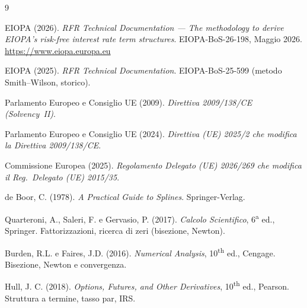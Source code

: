 \documentclass[11pt,a4paper]{article}
\theoremstyle{plain}
\theoremstyle{definition}
\theoremstyle{remark}
\begin{document}
\renewcommand{\refname}{Riferimenti bibliografici}
\begin{thebibliography}{9}

EIOPA (2026).
\textit{RFR Technical Documentation --- The methodology to derive EIOPA's risk-free
interest rate term structures}. EIOPA-BoS-26-198, Maggio 2026.
\url{https://www.eiopa.europa.eu}

EIOPA (2025).
\textit{RFR Technical Documentation}. EIOPA-BoS-25-599 (metodo Smith--Wilson, storico).

Parlamento Europeo e Consiglio UE (2009).
\textit{Direttiva 2009/138/CE (Solvency~II)}.

Parlamento Europeo e Consiglio UE (2024).
\textit{Direttiva (UE) 2025/2 che modifica la Direttiva 2009/138/CE}.

Commissione Europea (2025).
\textit{Regolamento Delegato (UE) 2026/269 che modifica il Reg.\ Delegato (UE) 2015/35}.

de Boor, C. (1978).
\textit{A Practical Guide to Splines}. Springer-Verlag.

Quarteroni, A., Saleri, F. e Gervasio, P. (2017).
\textit{Calcolo Scientifico}, 6\textsuperscript{a} ed., Springer.
Fattorizzazioni, ricerca di zeri (bisezione, Newton).

Burden, R.L. e Faires, J.D. (2016).
\textit{Numerical Analysis}, 10\textsuperscript{th} ed., Cengage.
Bisezione, Newton e convergenza.

Hull, J. C. (2018).
\textit{Options, Futures, and Other Derivatives}, 10\textsuperscript{th} ed., Pearson.
Struttura a termine, tasso par, IRS.

\end{thebibliography}
\end{document}
